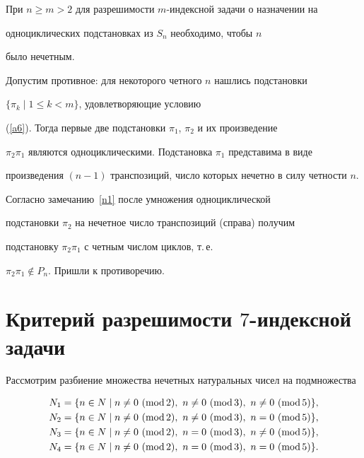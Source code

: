 \begin{thm}


\label{th1}


При $n \ge m > 2$ для разрешимости $m$-индексной задачи о назначении на


одноциклических подстановках из $S_n$ необходимо, чтобы $n$


было нечетным.


\end{thm}





\begin{pf}


Допустим противное: для некоторого четного $n$ нашлись подстановки


$\{\pi_k\mid 1\le k < m \}$, удовлетворяющие условию


(\ref{a6}). Тогда первые две подстановки $\pi_1$, $\pi_2$ и их произведение


$\pi_2\pi_1$ являются одноциклическими. Подстановка $\pi_1$ представима в виде


произведения $(n-1)$ транспозиций, число которых нечетно в силу четности $n$.


Согласно замечанию~\ref{n1} после умножения одноциклической


подстановки $\pi_2$ на нечетное число транспозиций (справа) получим


подстановку $\pi_2 \pi_1$ с четным числом циклов, т.\,е.


$\pi_2 \pi_1 \notin P_n$. Пришли к противоречию.


\end{pf}





\section{Критерий разрешимости $7$-индексной задачи}





Рассмотрим разбиение множества нечетных натуральных чисел на подмножества


\begin{align*}


N_1&=\{n\in N\mid n\ne 0\ (\Mod 2),\ n\ne 0\ (\Mod 3),\ n\ne 0\ (\Mod 5)\},\\


%


N_2&=\{n\in N\mid n\neq 0\ (\Mod 2),\ n\neq 0\ (\Mod 3),\ n=0\ (\Mod 5)\}, \\


%


N_3&=\{n\in N\mid n\neq 0\ (\Mod 2),\ n=0\ (\Mod 3),\ n\neq 0\ (\Mod 5)\},\\


%


N_4&=\{n\in N\mid n\neq 0\ (\Mod 2),\ n=0\ (\Mod 3),\ n=0\ (\Mod 5)\}.


\end{align*}





